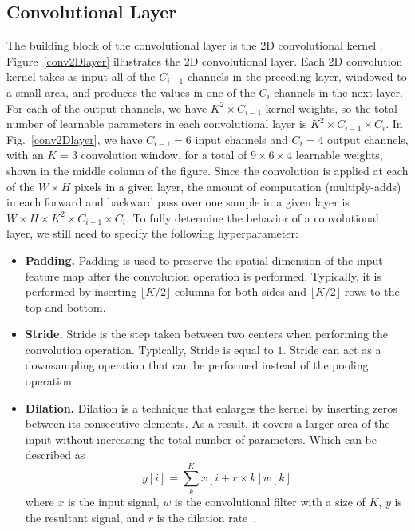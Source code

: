 \subsection{Convolutional Layer}
The building block of the convolutional layer is the 2D convolutional kernel \cite{lecun1989handwritten} \cite{krizhevsky2012imagenet}. Figure~\ref{conv2Dlayer} illustrates the 2D convolutional layer. Each 2D convolution kernel takes as input all of the $C_{i-1}$ channels in the preceding layer, windowed to a small area, and produces the values in one of the $C_{i}$ channels in the next layer. For each of the output channels, we have $K^2\times C_{i-1}$ kernel weights, so the total number of learnable parameters in each convolutional layer is $K^2\times C_{i-1} \times C_{i}$. In Fig.~\ref{conv2Dlayer}, we have $C_{i-1} = 6$ input channels and $C_{i} = 4$ output channels, with an $K = 3$ convolution window, for a total of $9 \times 6 \times 4$ learnable weights, shown in the middle column of the figure. Since the convolution is applied at each of the $W \times H$ pixels in a given layer, the amount of computation (multiply-adds) in each forward and backward pass
over one sample in a given layer is $W\times H \times K^{2} \times C_{i-1} \times C_{i}$.
To fully determine the behavior of a convolutional layer, we still need to specify the following hyperparameter:
\begin{itemize}
    \item \textbf{Padding.} Padding is used to preserve the spatial dimension of the input feature map after the convolution operation is performed. Typically, it is performed by inserting $\lfloor K/2 \rfloor$ columns for both sides and $\lfloor K/2 \rfloor$ rows to the top and bottom.
    \item \textbf{Stride.} Stride is the step taken between two centers when performing the convolution operation. Typically, Stride is equal to $1$. Stride can act as a downsampling operation that can be performed instead of the pooling operation.
    \item \textbf{Dilation.} Dilation is a technique that enlarges the kernel by inserting zeros between its consecutive elements. As a result, it covers a larger area of the input without increasing the total number of parameters. Which can be described as 
    \begin{equation}\label{eq:logistic}
        y[i]=\sum_{k}^{K} x[i+r\times k] w[k]
    \end{equation}
     where $x$ is the input signal, $w$ is the convolutional filter with a size of $K$, $y$ is the resultant signal, and $r$ is the dilation rate~\cite{chen2017deeplab}.
\end{itemize}

